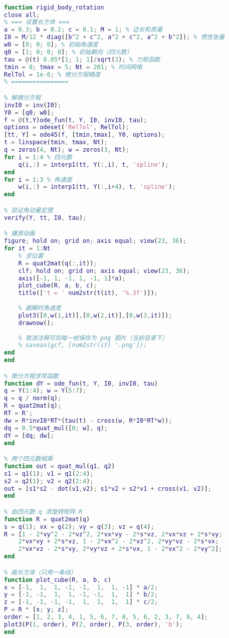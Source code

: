 \begin{lstlisting}[language=matlab, caption=rigBdRot.m]
% 刚体绕固定点转动的数值计算

function rigid_body_rotation
close all;
% === 设置长方体 ===
a = 0.3; b = 0.2; c = 0.1; M = 1; % 边长和质量
I0 = M/12 * diag([b^2 + c^2, a^2 + c^2, a^2 + b^2]); % 惯性张量
w0 = [0; 0; 0]; % 初始角速度
q0 = [1; 0; 0; 0]; % 初始朝向（四元数）
tau = @(t) 0.05*[1; 1; 1]/sqrt(3); % 力矩函数
tmin = 0; tmax = 5; Nt = 201; % 时间网格
RelTol = 1e-6; % 微分方程精度
% ================

% 解微分方程
invI0 = inv(I0);
Y0 = [q0; w0];
f = @(t,Y)ode_fun(t, Y, I0, invI0, tau);
options = odeset('RelTol', RelTol);
[tt, Y] = ode45(f, [tmin,tmax], Y0, options);
t = linspace(tmin, tmax, Nt);
q = zeros(4, Nt); w = zeros(3, Nt);
for i = 1:4 % 四元数
    q(i,:) = interp1(tt, Y(:,i), t, 'spline');
end
for i = 1:3 % 角速度
    w(i,:) = interp1(tt, Y(:,i+4), t, 'spline');
end

% 验证角动量定理
verify(Y, tt, I0, tau);

% 播放动画
figure; hold on; grid on; axis equal; view(23, 36);
for it = 1:Nt
    % 求位置
    R = quat2mat(q(:,it));
    clf; hold on; grid on; axis equal; view(23, 36);
    axis([-1, 1, -1, 1, -1, 1]*a);
    plot_cube(R, a, b, c);
    title(['t = ' num2str(t(it), '%.3f')]);
    
    % 画瞬时角速度
    plot3([0,w(1,it)],[0,w(2,it)],[0,w(3,it)]);
    drawnow();
    
    % 取消注释可将每一帧保存为 png 图片（当前目录下）
    % saveas(gcf, [num2str(it) '.png']);
end
end

% 微分方程求导函数
function dY = ode_fun(t, Y, I0, invI0, tau)
q = Y(1:4); w = Y(5:7);
q = q / norm(q);
R = quat2mat(q);
RT = R';
dw = R*invI0*RT*(tau(t) - cross(w, R*I0*RT*w));
dq = 0.5*quat_mul([0; w], q);
dY = [dq; dw];
end

% 两个四元数相乘
function out = quat_mul(q1, q2)
s1 = q1(1); v1 = q1(2:4);
s2 = q2(1); v2 = q2(2:4);
out = [s1*s2 - dot(v1,v2); s1*v2 + s2*v1 + cross(v1, v2)];
end

% 由四元数 q 求旋转矩阵 R
function R = quat2mat(q)
s = q(1); vx = q(2); vy = q(3); vz = q(4);
R = [1 - 2*vy^2 - 2*vz^2, 2*vx*vy - 2*s*vz, 2*vx*vz + 2*s*vy;
    2*vx*vy + 2*s*vz, 1 - 2*vx^2 - 2*vz^2, 2*vy*vz - 2*s*vx;
    2*vx*vz - 2*s*vy, 2*vy*vz + 2*s*vx, 1 - 2*vx^2 - 2*vy^2];
end

% 画长方体（只用一条线）
function plot_cube(R, a, b, c)
x = [-1,  1,  1, -1, -1,  1,  1, -1] * a/2;
y = [-1, -1,  1,  1, -1, -1,  1,  1] * b/2;
z = [-1, -1, -1, -1,  1,  1,  1,  1] * c/2;
P = R * [x; y; z];
order = [1, 2, 3, 4, 1, 5, 6, 7, 8, 5, 6, 2, 3, 7, 8, 4];
plot3(P(1, order), P(2, order), P(3, order), 'b');
end


\end{lstlisting}

